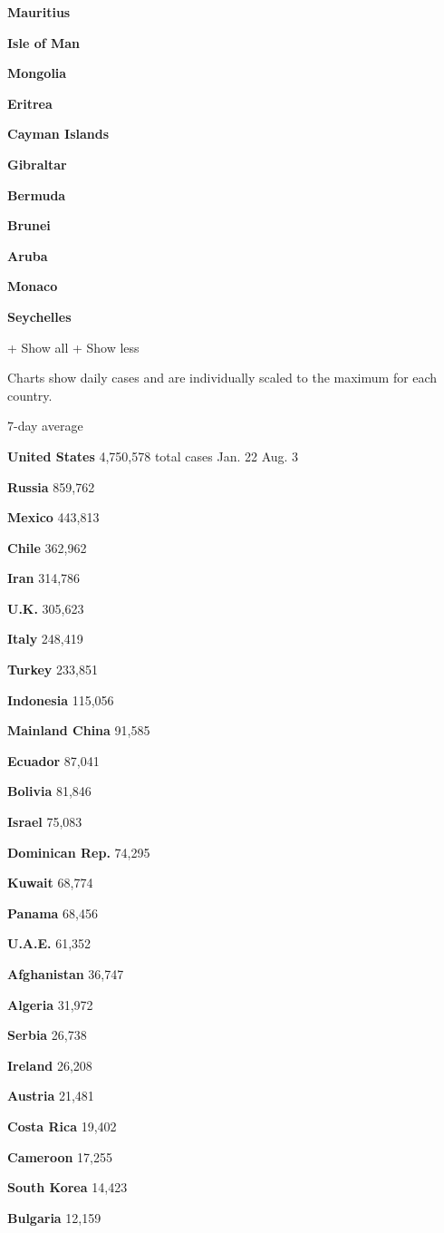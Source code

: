 \textbf{Mauritius}

\textbf{Isle of Man}

\textbf{Mongolia}

\textbf{Eritrea}

\textbf{Cayman Islands}

\textbf{Gibraltar}

\textbf{Bermuda}

\textbf{Brunei}

\textbf{Aruba}

\textbf{Monaco}

\textbf{Seychelles}

+ Show all + Show less

Charts show daily cases and are individually scaled to the maximum for
each country.

7-day average

\textbf{United States} 4,750,578 total cases Jan. 22 Aug. 3

\textbf{Russia} 859,762

\textbf{Mexico} 443,813

\textbf{Chile} 362,962

\textbf{Iran} 314,786

\textbf{U.K.} 305,623

\textbf{Italy} 248,419

\textbf{Turkey} 233,851

\textbf{Indonesia} 115,056

\textbf{Mainland China} 91,585

\textbf{Ecuador} 87,041

\textbf{Bolivia} 81,846

\textbf{Israel} 75,083

\textbf{Dominican Rep.} 74,295

\textbf{Kuwait} 68,774

\textbf{Panama} 68,456

\textbf{U.A.E.} 61,352

\textbf{Afghanistan} 36,747

\textbf{Algeria} 31,972

\textbf{Serbia} 26,738

\textbf{Ireland} 26,208

\textbf{Austria} 21,481

\textbf{Costa Rica} 19,402

\textbf{Cameroon} 17,255

\textbf{South Korea} 14,423

\textbf{Bulgaria} 12,159

